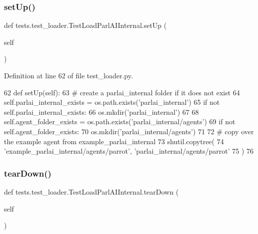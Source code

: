 \subsubsection{\texorpdfstring{set\+Up()}{setUp()}}
{\footnotesize\ttfamily def tests.\+test\+\_\+loader.\+Test\+Load\+Parl\+A\+I\+Internal.\+set\+Up (\begin{DoxyParamCaption}\item[{}]{self }\end{DoxyParamCaption})}



Definition at line 62 of file test\+\_\+loader.\+py.


\begin{DoxyCode}
62     \textcolor{keyword}{def }setUp(self):
63         \textcolor{comment}{# create a parlai\_internal folder if it does not exist}
64         self.parlai\_internal\_exists = os.path.exists(\textcolor{stringliteral}{'parlai\_internal'})
65         \textcolor{keywordflow}{if} \textcolor{keywordflow}{not} self.parlai\_internal\_exists:
66             os.mkdir(\textcolor{stringliteral}{'parlai\_internal'})
67 
68         self.agent\_folder\_exists = os.path.exists(\textcolor{stringliteral}{'parlai\_internal/agents'})
69         \textcolor{keywordflow}{if} \textcolor{keywordflow}{not} self.agent\_folder\_exists:
70             os.mkdir(\textcolor{stringliteral}{'parlai\_internal/agents'})
71 
72         \textcolor{comment}{# copy over the example agent from example\_parlai\_internal}
73         shutil.copytree(
74             \textcolor{stringliteral}{'example\_parlai\_internal/agents/parrot'}, \textcolor{stringliteral}{'parlai\_internal/agents/parrot'}
75         )
76 
\end{DoxyCode}
\mbox{\label{classtests_1_1test__loader_1_1TestLoadParlAIInternal_a35bb2f05c24011675c9757645f3d2818}} 
\subsubsection{\texorpdfstring{tear\+Down()}{tearDown()}}
{\footnotesize\ttfamily def tests.\+test\+\_\+loader.\+Test\+Load\+Parl\+A\+I\+Internal.\+tear\+Down (\begin{DoxyParamCaption}\item[{}]{self }\end{DoxyParamCaption})}



